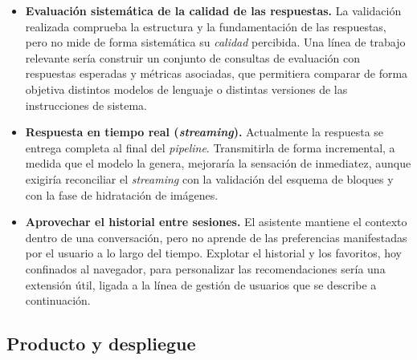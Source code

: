 \begin{itemize}
  \item \textbf{Evaluación sistemática de la calidad de las respuestas.} La
        validación realizada comprueba la estructura y la fundamentación de las
        respuestas, pero no mide de forma sistemática su \emph{calidad} percibida.
        Una línea de trabajo relevante sería construir un conjunto de consultas de
        evaluación con respuestas esperadas y métricas asociadas, que permitiera
        comparar de forma objetiva distintos modelos de lenguaje o distintas
        versiones de las instrucciones de sistema.

  \item \textbf{Respuesta en tiempo real (\emph{streaming}).} Actualmente la
        respuesta se entrega completa al final del \emph{pipeline}. Transmitirla de
        forma incremental, a medida que el modelo la genera, mejoraría la sensación
        de inmediatez, aunque exigiría reconciliar el \emph{streaming} con la
        validación del esquema de bloques y con la fase de hidratación de imágenes.

  \item \textbf{Aprovechar el historial entre sesiones.} El asistente mantiene el
        contexto dentro de una conversación, pero no aprende de las preferencias
        manifestadas por el usuario a lo largo del tiempo. Explotar el historial y
        los favoritos, hoy confinados al navegador, para personalizar las
        recomendaciones sería una extensión útil, ligada a la línea de gestión de
        usuarios que se describe a continuación.
\end{itemize}

\subsection*{Producto y despliegue}

